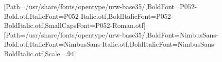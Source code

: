 \CoreLayout
\renewcommand{\familydefault}{\rmdefault}
\renewcommand{\KomorebiCover}{%
 \clearpage\hypersetup{pageanchor=false}\thispagestyle{empty}\begingroup
 \setlength{\parindent}{0pt}\setlength{\parskip}{0pt}
 \vspace*{22pt}
 {\sffamily\fontsize{8.5}{11}\selectfont\color{pubTeal}\MakeUppercase{\KomorebiSeries}\par}
 \vspace{30pt}
 {\rmfamily\fontsize{30}{36}\selectfont\color{pubNavy}\raggedright\KomorebiTitle\par}
 \vspace{18pt}
 {\rmfamily\fontsize{19}{25}\selectfont\color{pubNavy}\raggedright\KomorebiSubtitle\par}
 \vspace{24pt}\textcolor{pubCopper}{\rule{42pt}{.8pt}}\par\vspace{18pt}
 {\sffamily\fontsize{10}{14}\selectfont\color{pubMuted}\KomorebiKind\par}
 \vfill
 {\rmfamily\fontsize{13}{17}\selectfont Komorebi P.\par}\vspace{9pt}
 {\sffamily\fontsize{8.5}{12}\selectfont\color{pubMuted}\KomorebiEdition\par}
 \vspace{20pt}\endgroup\clearpage\setcounter{page}{1}\hypersetup{pageanchor=true}\color{pubInk}\normalfont
}

\setmainfont{P052-Roman.otf}[Path=/usr/share/fonts/opentype/urw-base35/,BoldFont=P052-Bold.otf,ItalicFont=P052-Italic.otf,BoldItalicFont=P052-BoldItalic.otf,SmallCapsFont=P052-Roman.otf]
\setsansfont{NimbusSans-Regular.otf}[Path=/usr/share/fonts/opentype/urw-base35/,BoldFont=NimbusSans-Bold.otf,ItalicFont=NimbusSans-Italic.otf,BoldItalicFont=NimbusSans-BoldItalic.otf,Scale=.94]
